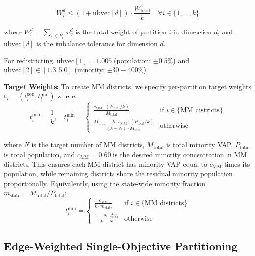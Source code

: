 \begin{equation}
W_i^d \leq (1 + \text{ubvec}[d]) \cdot \frac{W_{\text{total}}^d}{k} \quad \forall i \in \{1, \ldots, k\}
\end{equation}

where $W_i^d = \sum_{v \in P_i} w_v^d$ is the total weight of partition $i$ in dimension $d$, and $\text{ubvec}[d]$ is the imbalance tolerance for dimension $d$.

For redistricting, $\text{ubvec}[1] = 1.005$ (population: $\pm0.5\%$) and $\text{ubvec}[2] \in [1.3, 5.0]$ (minority: $\pm30-400\%$).

\textbf{Target Weights:} To create MM districts, we specify per-partition target weights $\mathbf{t}_i = (t_i^{\text{pop}}, t_i^{\text{min}})$ where:
\begin{equation}
t_i^{\text{pop}} = \frac{1}{k}, \quad
t_i^{\text{min}} = \begin{cases}
\frac{c_{\text{MM}} \cdot (P_{\text{total}} / k)}{M_{\text{total}}} & \text{if } i \in \{\text{MM districts}\} \\
\frac{M_{\text{total}} - N \cdot c_{\text{MM}} \cdot (P_{\text{total}} / k)}{(k - N) \cdot M_{\text{total}}} & \text{otherwise}
\end{cases}
\end{equation}

where $N$ is the target number of MM districts, $M_{\text{total}}$ is total minority VAP, $P_{\text{total}}$ is total population, and $c_{\text{MM}} = 0.60$ is the desired minority concentration in MM districts. This ensures each MM district has minority VAP equal to $c_{\text{MM}}$ times its population, while remaining districts share the residual minority population proportionally. Equivalently, using the state-wide minority fraction $m_{\text{state}} = M_{\text{total}} / P_{\text{total}}$:
\begin{equation}
t_i^{\text{min}} = \begin{cases}
\frac{c_{\text{MM}}}{k \cdot m_{\text{state}}} & \text{if } i \in \{\text{MM districts}\} \\
\frac{1 - N \cdot t_{\text{MM}}^{\text{min}}}{k - N} & \text{otherwise}
\end{cases}
\end{equation}

\subsection{Edge-Weighted Single-Objective Partitioning}

